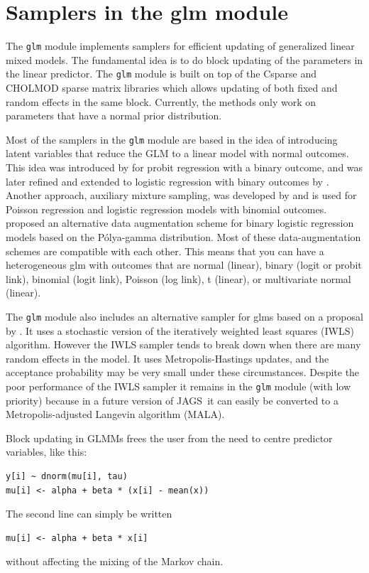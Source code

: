 \documentclass[11pt, a4paper, titlepage]{report}
\newcommand{\JAGS}{\textsf{JAGS}}
\begin{document}
\section{Samplers in the glm module}
\label{section:glm::samplers}

The \texttt{glm} module implements samplers for efficient updating of
generalized linear mixed models.  The fundamental idea is to do block
updating of the parameters in the linear predictor.  The \texttt{glm}
module is built on top of the \textsf{Csparse} and \textsf{CHOLMOD}
sparse matrix libraries \citep{Davis2006, Davis1999} which allows
updating of both fixed and random effects in the same
block. Currently, the methods only work on parameters that have a
normal prior distribution.

Most of the samplers in the \texttt{glm} module are based in the idea
of introducing latent variables that reduce the GLM to a linear model
with normal outcomes. This idea was introduced by \citet{AlbertChib93}
for probit regression with a binary outcome, and was later refined and
extended to logistic regression with binary outcomes by
\citet{HolmesHeld06}. Another approach, auxiliary mixture sampling,
was developed by \citet{Fruhwirth-Schnatter09} and is used for Poisson
regression and logistic regression models with binomial outcomes.
\citet{PolsonEtal2013} proposed an alternative data augmentation
scheme for binary logistic regression models based on the
P\'{o}lya-gamma distribution. Most of these data-augmentation schemes
are compatible with each other. This means that you can have a
heterogeneous glm with outcomes that are normal (linear), binary
(logit or probit link), binomial (logit link), Poisson (log link),
t (linear), or multivariate normal (linear).

The \texttt{glm} module also includes an alternative sampler for glms
based on a proposal by \citet{Gamerman97}. It uses a stochastic
version of the iteratively weighted least squares (IWLS)
algorithm. However the IWLS sampler tends to break down when there are
many random effects in the model. It uses Metropolis-Hastings updates,
and the acceptance probability may be very small under these
circumstances. Despite the poor performance of the IWLS sampler it
remains in the \texttt{glm} module (with low priority) because in a
future version of \JAGS\ it can easily be converted to a
Metropolis-adjusted Langevin algorithm (MALA).

Block updating in GLMMs frees the user from the need to centre
predictor variables, like this:
\begin{verbatim}
y[i] ~ dnorm(mu[i], tau)
mu[i] <- alpha + beta * (x[i] - mean(x))
\end{verbatim}
The second line can simply be written
\begin{verbatim}
mu[i] <- alpha + beta * x[i]
\end{verbatim}
without affecting the mixing of the Markov chain.  
\end{document}
